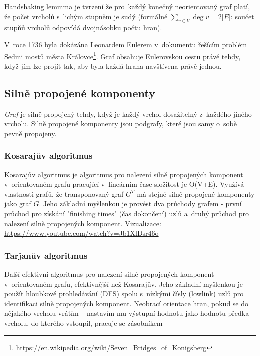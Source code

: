 Handshaking lemmma je tvrzení že pro~každý konečný neorientovaný graf platí, že počet vrcholů s~lichým stupněm je sudý (formálně $\sum_{v \in V} \deg v = 2 |E|$: součet stupňů vrcholů odpovídá dvojnásobku počtu hran).

V~roce 1736 byla dokázána Leonardem Eulerem v~dokumentu řešícím problém Sedmi mostů města Královce\footnote{\url{https://en.wikipedia.org/wiki/Seven_Bridges_of_Konigsberg}}.
Graf obsahuje Eulerovskou cestu právě tehdy, když jím lze projít tak, aby byla každá hrana navštívena právě jednou.

\subsection{Silně propojené komponenty}

\emph{Graf} je silně propojený tehdy, když je každý vrchol dosažitelný z~každého jiného vrcholu.
Silně propojené komponenty jsou podgrafy, které jsou samy o~sobě pevně propojeny.

\subsubsection{Kosarajův algoritmus}

Kosarajův algoritmus je algoritmus pro nalezení silně propojených komponent v~orientovaném grafu pracující v~lineárním čase složitost je O(V+E).
Využívá vlastnosti grafů, že transponovaný graf \(G^T\) má stejné silně propojené komponenty jako graf \(G\).
Jeho základní myšlenkou je provést dva průchody grafem - první průchod pro získání "finishing times" (čas dokončení) uzlů a~druhý průchod pro 
nalezení silně propojených komponent.
Vizualizace: \url{https://www.youtube.com/watch?v=Jb1XlDsr46o}

\subsubsection{Tarjanův algoritmus}

Další efektivní algoritmus pro nalezení silně propojených komponent v~orientovaném grafu, efektivnější než Kosarajův. Jeho základní myšlenkou je použít hloubkové prohledávání (DFS) spolu s~nízkými čísly (lowlink) uzlů pro identifikaci silně propojených komponent. Neobrací orientace hran, pokud se do nějakého vrcholu vrátím -- nastavím mu výstupní hodnotu jako hodnotu předka vrcholu, do kterého vstoupil, pracuje se zásobníkem

